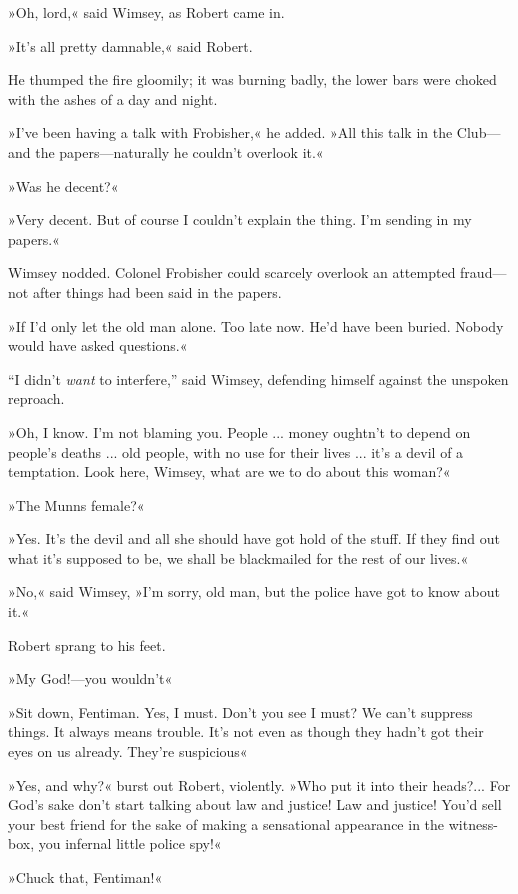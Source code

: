 »Oh, lord,« said Wimsey, as Robert came in.

»It's all pretty damnable,« said Robert.

He thumped the fire gloomily; it was burning badly, the lower bars were choked with the ashes of a day and night.

»I've been having a talk with Frobisher,« he added. »All this talk in the Club\allowbreak---\allowbreak and the papers\allowbreak---\allowbreak naturally he couldn't overlook it.«

»Was he decent?«

»Very decent. But of course I couldn't explain the thing. I'm sending in my papers.«

Wimsey nodded. Colonel Frobisher could scarcely overlook an attempted fraud\allowbreak---\allowbreak not after things had been said in the papers.

»If I'd only let the old man alone. Too late now. He'd have been buried. Nobody would have asked questions.«

\enquote{I didn't \textit{want} to interfere,} said Wimsey, defending himself against the unspoken reproach.

»Oh, I know. I'm not blaming you. People ... money oughtn't to depend on people's deaths ... old people, with no use for their lives ... it's a devil of a temptation. Look here, Wimsey, what are we to do about this woman?«

»The Munns female?«

»Yes. It's the devil and all she should have got hold of the stuff. If they find out what it's supposed to be, we shall be blackmailed for the rest of our lives.«

»No,« said Wimsey, »I'm sorry, old man, but the police have got to know about it.«

Robert sprang to his feet.

»My God!---you wouldn't\longdash«

»Sit down, Fentiman. Yes, I must. Don't you see I must? We can't suppress things. It always means trouble. It's not even as though they hadn't got their eyes on us already. They're suspicious\longdash«

»Yes, and why?« burst out Robert, violently. »Who put it into their heads?... For God's sake don't start talking about law and justice! Law and justice! You'd sell your best friend for the sake of making a sensational appearance in the witness-box, you infernal little police spy!«

»Chuck that, Fentiman!«

